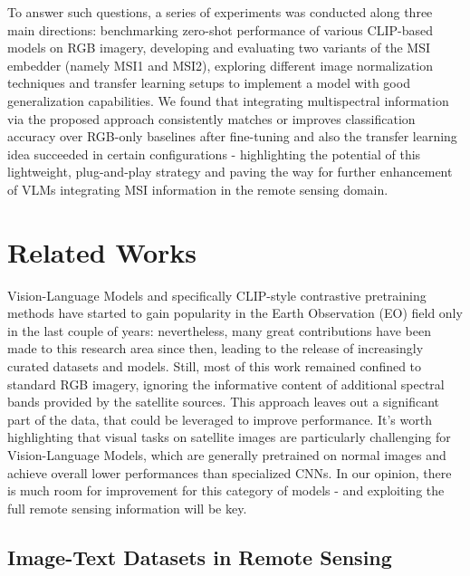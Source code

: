 \documentclass[a4paper, oneside, english]{sapthesis} %
\begin{document}
To answer such questions, a series of experiments was conducted along three main directions: benchmarking zero-shot performance of various CLIP-based models on RGB imagery, developing and evaluating two variants of the MSI embedder (namely MSI1 and MSI2), exploring different image normalization techniques and transfer learning setups to implement a model with good generalization capabilities. We found that integrating multispectral information via the proposed approach consistently matches or improves classification accuracy over RGB-only baselines after fine-tuning and also the transfer learning idea succeeded in certain configurations - highlighting the potential of this lightweight, plug-and-play strategy and paving the way for further enhancement of VLMs integrating MSI information in the remote sensing domain.

\chapter{Related Works} %

Vision-Language Models and specifically CLIP-style contrastive pretraining methods have started to gain popularity in the Earth Observation (EO) field only in the last couple of years: nevertheless, many great contributions have been made to this research area since then, leading to the release of increasingly curated datasets and models. Still, most of this work remained confined to standard RGB imagery, ignoring the informative content of additional spectral bands provided by the satellite sources. This approach leaves out a significant part of the data, that could be leveraged to improve performance. It's worth highlighting that visual tasks on satellite images are particularly challenging for Vision-Language Models, which are generally pretrained on normal images and achieve overall lower performances than specialized CNNs. In our opinion, there is much room for improvement for this category of models - and exploiting the full remote sensing information will be key.

\section{Image-Text Datasets in Remote Sensing}
\end{document}
